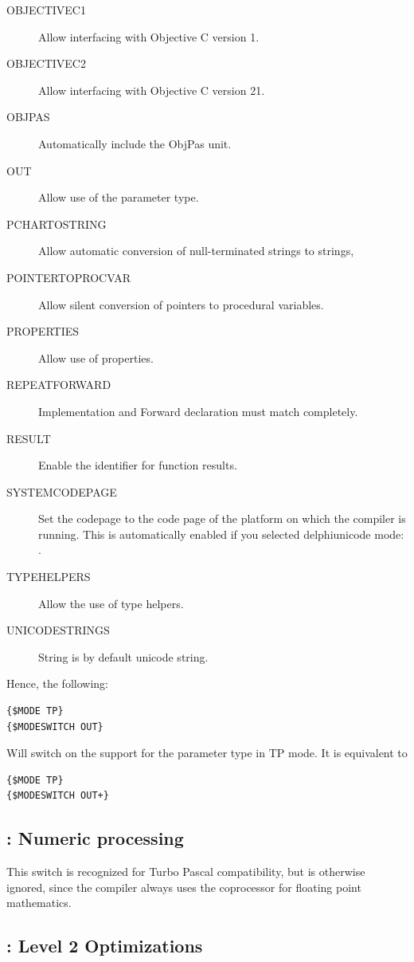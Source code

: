 \begin{description}
\item[OBJECTIVEC1] Allow interfacing with Objective C version 1.
\item[OBJECTIVEC2] Allow interfacing with Objective C version 21.
\item[OBJPAS] Automatically include the ObjPas unit.
\item[OUT] Allow use of the  parameter type.
\item[PCHARTOSTRING] Allow automatic conversion of null-terminated strings to strings,
\item[POINTERTOPROCVAR] Allow silent conversion of pointers to procedural variables.
\item[PROPERTIES] Allow use of properties.
\item[REPEATFORWARD] Implementation and Forward declaration must match completely.
\item[RESULT] Enable the  identifier for function results.
\item[SYSTEMCODEPAGE] Set the codepage to the code page of the platform on
which the compiler is running. This is automatically enabled if you selected
delphiunicode mode: .  
\item[TYPEHELPERS] Allow the use of type helpers.
\item[UNICODESTRINGS] String is by default unicode string.
\end{description}

Hence, the following:
\begin{verbatim}
{$MODE TP}
{$MODESWITCH OUT}
\end{verbatim}
Will switch on the support for the  parameter type in TP mode. It
is equivalent to
\begin{verbatim}
{$MODE TP}
{$MODESWITCH OUT+}
\end{verbatim}

\subsection{ : Numeric processing }

This switch is recognized for Turbo Pascal compatibility, but is otherwise
ignored, since the compiler always uses the coprocessor for floating point
mathematics.

\subsection{ : Level 2 Optimizations }

